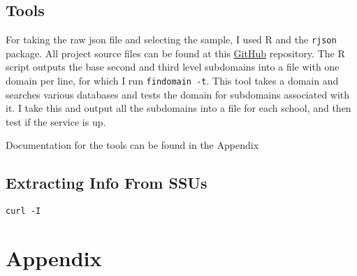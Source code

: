 \documentclass{article}
\theoremstyle{definition}
\begin{document}
\begin{flushleft}
\section{Tools} \label{sec:tools}
For taking the raw json file and selecting the sample, I used R and the \texttt{rjson}
package. All project source files can be found at this
\href{https://github.com/chrissobczak/os-survey}{GitHub} repository.
The R script outputs the base second and third level subdomains
into a file with one domain per line, for which I run \texttt{findomain -t}.
This tool takes a domain and searches various databases and tests the domain
for subdomains associated with it. I take this and output all the subdomains
into a file for each school, and then test if the service is up.

Documentation for the tools can be found in the Appendix
\subsection{Extracting Info From SSUs}
\texttt{curl -I}


\end{flushleft}
\printbibliography
\section{Appendix}
\end{document}
